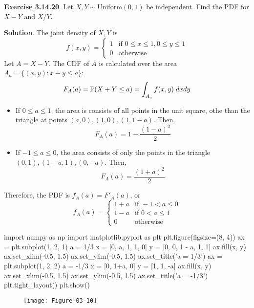 \textbf{Exercise 3.14.20}. Let \(X, Y \sim \text{Uniform}(0, 1)\) be
independent. Find the PDF for \(X - Y\) and \(X / Y\).

\textbf{Solution}.
The joint density of \(X, Y\) is
\[
f(x, y) = 
\begin{cases}
1 &\text{if } 0 \leq x \leq 1, 0 \leq y \leq 1 
\\[
1ex]
0 &\text{otherwise}
\end{cases}
\]
Let \(A = X - Y\). The CDF of \(A\) is calculated over the area
\(A_a = \{ (x, y) : x - y \leq a \}\):
\[
F_A(a) = \operatorname{\mathbb{P}}(X + Y \leq a) = \int_{A_a} f(x, y)\; dx dy
\]
\begin{itemize}
\item
  If \(0 \leq a \leq 1\), the area is consists of all points in the unit
  square, othe than the triangle at points
  \((a, 0), (1, 0), (1, 1 - a)\). Then,
  \[
F_A(a) = 1 - \frac{(1 - a)^{2}}{2}
\]
\item
  If \(-1 \leq a \leq 0\), the area consists of only the points in the
  triangle \((0, 1), (1 + a, 1), (0, -a)\). Then,
  \[
F_A(a) = \frac{(1 + a)^{2}}{2}
\]
\end{itemize}
Therefore, the PDF is \(f_A(a) = F'_A(a)\), or
\[
f_A(a) =
\begin{cases}
1 + a &\text{if } -1 < a \leq 0
\\[
1ex]
1 - a &\text{if } 0 < a \leq 1
\\[
1ex]
0 &\text{otherwise}
\end{cases} 
\]

\begin{python}
import numpy as np
import matplotlib.pyplot as plt
plt.figure(figsize=(8, 4))
ax = plt.subplot(1, 2, 1)
a = 1/3
x = [0, a, 1, 1, 0]
y = [0, 0, 1 - a, 1, 1]
ax.fill(x, y)
ax.set_xlim(-0.5, 1.5)
ax.set_ylim(-0.5, 1.5)
ax.set_title('a = 1/3')
ax = plt.subplot(1, 2, 2)
a = -1/3
x = [0, 1+a, 0]
y = [1, 1, -a]
ax.fill(x, y)
ax.set_xlim(-0.5, 1.5)
ax.set_ylim(-0.5, 1.5)
ax.set_title('a = -1/3')
plt.tight_layout()
plt.show()
\end{python}

\begin{figure}[H]
\centering
\texttt{[image: Figure-03-10]}
\end{figure}

